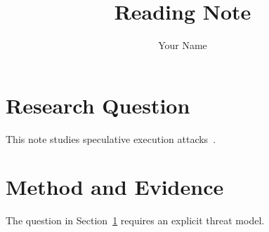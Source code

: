 \documentclass{article}
\title{Reading Note}
\author{Your Name}
\begin{document}
\maketitle
\section{Research Question}\label{sec:question}
This note studies speculative execution attacks~\cite{kocher2019spectre}.
\section{Method and Evidence}
The question in Section~\ref{sec:question} requires an explicit threat model.


\end{document}

